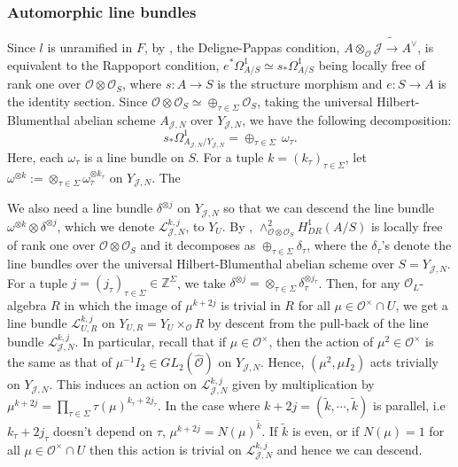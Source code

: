 \documentclass[a4paper,oneside]{amsart}
\theoremstyle{plain}
\theoremstyle{definition}
\begin{document}
\subsubsection{Automorphic line bundles} Since $l$ is unramified in $F$, by \cite[Cor. 2.9]{delignepappas}, the Deligne-Pappas condition, $A \otimes_{\mathcal{O}} \mathcal{J} \tilde{\rightarrow} A^\vee$, is equivalent to the Rappoport condition, $e^* \Omega^1_{A/S} \simeq s_*\Omega^1_{A/S} $ being locally free of rank one over $\mathcal{O} \otimes \mathcal{O}_S$, where $s: A \rightarrow S$ is the structure morphism and $e: S \rightarrow A$ is the identity section. Since $\mathcal{O} \otimes \mathcal{O}_S \simeq \oplus_{\tau \in \Sigma} \mathcal{O}_S$, taking the universal Hilbert-Blumenthal abelian scheme $A_{\mathcal{J},N}$ over $Y_{\mathcal{J},N}$, we have the following decomposition:
\begin{equation*}
    s_* \Omega^1_{A_{\mathcal{J},N}/ Y_{\mathcal{J},N}} = \oplus_{\tau \in \Sigma} \ \omega_{\tau}.
\end{equation*}
Here, each $\omega_\tau$ is a line bundle on $S$. For a tuple $k = (k_\tau)_{\tau \in \Sigma}$, let $\omega^{\otimes k}:= \otimes_{\tau\in \Sigma} \omega_\tau^{\otimes k_{\tau}}$ on $Y_{\mathcal{J},N}$. The 

We also need a line bundle $\delta^{\otimes j}$ on $Y_{\mathcal{J},N}$ so that we can descend the line bundle $\omega^{\otimes k} \otimes \delta^{\otimes j}$, which we denote $\mathcal{L}_{\mathcal{J},N}^{k,j}$, to $Y_U$. By \cite{diamondsasaki}, $\wedge^2_{\mathcal{O}\otimes \mathcal{O}_S} H^1_{DR}(A/S)$ is locally free of rank one over $\mathcal{O} \otimes \mathcal{O}_S$ and it decomposes as $\oplus_{\tau \in \Sigma} \delta_{\tau}$, where the $\delta_\tau$'s denote the line bundles over the universal Hilbert-Blumenthal abelian scheme over $S= Y_{\mathcal{J},N}$. For a tuple $j = (j_\tau)_{\tau \in \Sigma} \in \mathbb{Z}^\Sigma$, we take $\delta^{\otimes j} = \otimes_{\tau \in \Sigma} \delta_\tau^{\otimes j_\tau}$. Then, for any $\mathcal{O}_L$-algebra $R$ in which the image of $\mu^{k+2j}$ is trivial in $R$ for all $\mu \in \mathcal{O}^\times \cap U$, we get a line bundle $\mathcal{L}_{U,R}^{k,j}$ on $Y_{U,R} = Y_U \times_{\mathcal{O}} R$ by descent from the pull-back of the line bundle $\mathcal{L}_{\mathcal{J},N}^{k,j}$. In particular, recall that if $\mu \in \mathcal{O}^\times$, then the action of $\mu^2 \in \mathcal{O}^\times$ is the same as that of $\mu^{-1}I_2 \in GL_2(\hat{\mathcal{O}})$ on $Y_{\mathcal{J},N}$. Hence, $(\mu^2, \mu I_2)$ acts trivially on $Y_{\mathcal{J},N}$. This induces an action on $\mathcal{L}_{\mathcal{J},N}^{k,j}$ given by multiplication by $\mu^{k+2j}=\prod_{\tau \in \Sigma} \tau(\mu)^{k_\tau + 2j_\tau}$. In the case where $k+2j=(\tilde{k}, \cdots, \tilde{k})$ is parallel, i.e $k_\tau+2j_\tau$ doesn't depend on $\tau$, $\mu^{k+2j} = N(\mu)^{\tilde{k}}$. If $\tilde{k}$ is even, or if $N(\mu)=1$ for all $\mu \in \mathcal{O}^\times \cap U$ then this action  is trivial on $\mathcal{L}_{\mathcal{J},N}^{k,j}$ and hence we can descend. 
\end{document}
